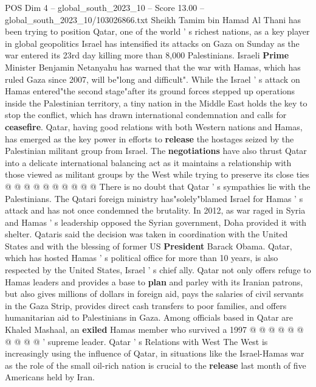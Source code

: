 \begin{textsample}{POS Dim 4 – global\_south\_2023\_10 – Score 13.00 – global\_south\_2023\_10/103026866.txt}  \label{ex:f4_pos_422}
Sheikh Tamim bin Hamad Al Thani has been trying to position Qatar, one of the world ' s richest nations, as a key player in global geopolitics Israel has intensified its attacks on Gaza on Sunday as the war entered its 23rd day killing more than 8,000 Palestinians.
Israeli \textbf{Prime} Minister Benjamin Netanyahu has warned that the war with Hamas, which has ruled Gaza since 2007, will be"long and difficult".
While the Israel ' s attack on Hamas entered"the second stage"after its ground forces stepped up operations inside the Palestinian territory, a tiny nation in the Middle East holds the key to stop the conflict, which has drawn international condemnation and calls for \textbf{ceasefire}.
Qatar, having good relations with both Western nations and Hamas, has emerged as the key power in efforts to \textbf{release} the hostages seized by the Palestinian militant group from Israel.
The \textbf{negotiations} have also thrust Qatar into a delicate international balancing act as it maintains a relationship with those viewed as militant groups by the West while trying to preserve its close ties @ @ @ @ @ @ @ @ @ @ There is no doubt that Qatar ' s sympathies lie with the Palestinians.
The Qatari foreign ministry has"solely"blamed Israel for Hamas ' s attack and has not once condemned the brutality.
In 2012, as war raged in Syria and Hamas ' s leadership opposed the Syrian government, Doha provided it with shelter.
Qataris said the decision was taken in coordination with the United States and with the blessing of former US \textbf{President} Barack Obama.
Qatar, which has hosted Hamas ' s political office for more than 10 years, is also respected by the United States, Israel ' s chief ally.
Qatar not only offers refuge to Hamas leaders and provides a base to \textbf{plan} and parley with its Iranian patrons, but also gives millions of dollars in foreign aid, pays the salaries of civil servants in the Gaza Strip, provides direct cash transfers to poor families, and offers humanitarian aid to Palestinians in Gaza.
Among officials based in Qatar are Khaled Mashaal, an \textbf{exiled} Hamas member who survived a 1997 @ @ @ @ @ @ @ @ @ @ ' supreme leader.
Qatar ' s Relations with West The West is increasingly using the influence of Qatar, in situations like the Israel-Hamas war as the role of the small oil-rich nation is crucial to the \textbf{release} last month of five Americans held by Iran.

\end{textsample}
